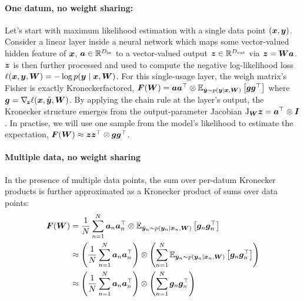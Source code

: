 \paragraph{One datum, no weight sharing:}
Let's start with maximum likelihood estimation with a single data point $({\bm{x}}, {\bm{y}})$.
Consider a linear layer inside a neural network which maps some vector-valued hidden feature of ${\bm{x}}$, ${\bm{a}} \in {\mathbb{R}}^{D_{\text{in}}}$ to a vector-valued output ${\bm{z}} \in {\mathbb{R}}^{D_{\text{out}}}$ via ${\bm{z}} = {\bm{W}} {\bm{a}}$.
${\bm{z}}$ is then further processed and used to compute the negative log-likelihood loss $\ell({\bm{x}}, {\bm{y}}, {\bm{W}}) = - \log p({\bm{y}} \mid {\bm{x}}, {\bm{W}})$.
For this single-usage layer, the weigh matrix's Fisher is exactly Kroneckerfactored, ${\bm{F}}({\bm{W}}) = {\bm{a}} {\bm{a}}^{\top} \otimes \mathbb{E}_{\hat{{\bm{y}}} \sim p({\bm{y}} \mid {\bm{x}}, {\bm{W}})}\left[ {\bm{g}} {\bm{g}}^{\top} \right]$ where ${\bm{g}} = \nabla_{\!{{\bm{z}}}} \ell({\bm{x}}, \hat{{\bm{y}}}, {\bm{W}})$.
By applying the chain rule at the layer's output, the Kronecker structure emerges from the output-parameter Jacobian $\mathrm{J}_{{\bm{W}}}{\bm{z}} = {\bm{a}}^{\top} \otimes {\bm{I}}$.
In practise, we will use one sample from the model's likelihood to estimate the expectation, ${\bm{F}}({\bm{W}}) \approx {\bm{z}} {\bm{z}}^{\top} \otimes {\bm{g}} {\bm{g}}^{\top}$.

\paragraph{Multiple data, no weight sharing} In the presence of multiple data points, the sum over per-datum Kronecker products is further approximated as a Kronecker product of sums over data points:
\begin{align*}
  {\bm{F}}({\bm{W}})
  &=
    \frac{1}{N}
    \sum_{n=1}^N
    {\bm{a}}_n {\bm{a}}_n^{\top} \otimes \mathbb{E}_{\hat{{\bm{y}}}_n \sim p({\bm{y}}_n \mid {\bm{x}}_n, {\bm{W}})}\left[ {\bm{g}}_n {\bm{g}}_n^{\top} \right]
  \\
  &\approx
    \left(
    \frac{1}{N}
    \sum_{n=1}^N
    {\bm{a}}_n {\bm{a}}_n^{\top}
    \right)
    \otimes
    \left(
    \sum_{n=1}^N
    \mathbb{E}_{\hat{{\bm{y}}}_n \sim p({\bm{y}}_n \mid {\bm{x}}_n, {\bm{W}})}\left[ {\bm{g}}_n {\bm{g}}_n^{\top} \right]
    \right)
  \\
  &\approx
    \left(
    \frac{1}{N}
    \sum_{n=1}^N
    {\bm{a}}_n {\bm{a}}_n^{\top}
    \right)
    \otimes
    \left(
    \sum_{n=1}^N
    {\bm{g}}_n {\bm{g}}_n^{\top}
    \right)
\end{align*}

